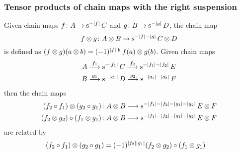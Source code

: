 \subsubsection{Tensor products of chain maps with the right suspension} Given chain maps $f \colon  A\to \operatorname{s}^{-|f|}C$ and $g \colon  B\to \operatorname{s}^{-|g|}D$, the chain map
\[
	f \otimes  g \colon  A \otimes  B\to \operatorname{s}^{-|f|-|g|}C \otimes  D
\]
is defined as $(f \otimes  g)(a \otimes  b) = (-1)^{|f||b|} f(a) \otimes  g(b)$. Given chain maps
\begin{align*}
	A & \overset{f_1}{\longrightarrow} \operatorname{s}^{-|f_1|} C \overset{f_2}{\longrightarrow} \operatorname{s}^{-|f_1|-|f_2|} E \\
	B & \overset{g_1}{\longrightarrow} \operatorname{s}^{-|g_1|} D \overset{g_2}{\longrightarrow} \operatorname{s}^{-|g_1|-|g_2|} F \\
\end{align*}
then the chain maps
\begin{align*}
(f_2\circ f_1) \otimes  (g_2\circ g_1) \colon  &A \otimes  B\longrightarrow \operatorname{s}^{-|f_1|-|f_2|-|g_1|-|g_2|}E \otimes  F
\\
(f_2 \otimes  g_2)\circ (f_1 \otimes  g_1) \colon  &A \otimes  B\longrightarrow \operatorname{s}^{-|f_1|-|f_2|-|g_1|-|g_2|}E \otimes  F
\end{align*}
 are related by
\begin{align*}
	(f_2\circ f_1) \otimes  (g_2\circ g_1) &= (-1)^{|f_2||g_1|}(f_2 \otimes  g_2)\circ (f_1 \otimes  g_1)
\end{align*}

